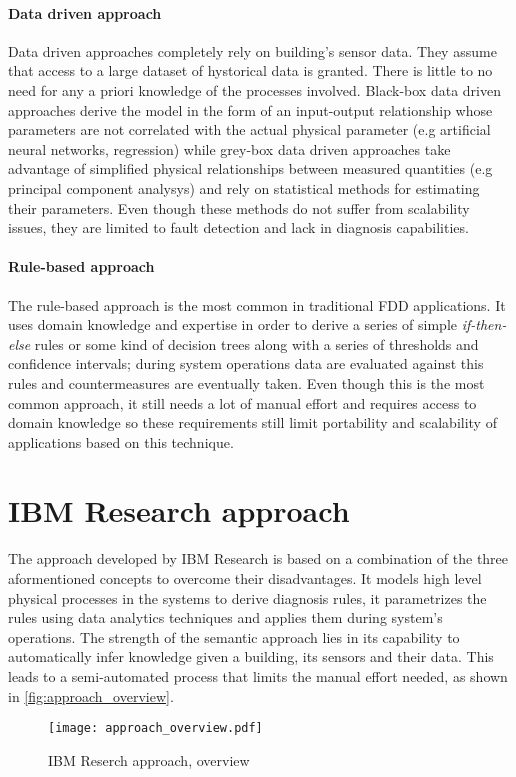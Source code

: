 \paragraph{Data driven approach} \label{subsec:data_models}
Data driven approaches completely rely on building's sensor data. They assume that access to a large dataset of hystorical data is granted. There is little to no need for any a priori knowledge of the processes involved. Black-box data driven approaches derive the model in the form of an input-output relationship whose parameters are not correlated with the actual physical parameter (e.g artificial neural networks, regression) while grey-box data driven approaches take advantage of simplified physical relationships between measured quantities (e.g principal component analysys) and rely on statistical methods for estimating their parameters. Even though these methods do not suffer from scalability issues, they are limited to fault detection and lack in diagnosis capabilities.

\paragraph{Rule-based approach} \label{subsec:rule_models}
The rule-based approach is the most common in traditional FDD applications. It uses domain knowledge and expertise in order to derive a series of simple \textit{if-then-else} rules or some kind of decision trees along with a series of thresholds and confidence intervals; during system operations data are evaluated against this rules and countermeasures are eventually taken. Even though this is the most common approach, it still needs a lot of manual effort and requires access to domain knowledge so these requirements still limit portability and scalability of applications based on this technique.

\section{IBM Research approach}
The approach developed by IBM Research is based on a combination of the three aformentioned concepts to overcome their disadvantages. It models high level physical processes in the systems to derive diagnosis rules, it parametrizes the rules using data analytics techniques and applies them during system's operations. The strength of the semantic approach lies in its capability to automatically infer knowledge given a building, its sensors and their data. This leads to a semi-automated process that limits the manual effort needed, as shown in \autoref{fig:approach_overview}.
\begin{figure}
  \centering
  \texttt{[image: approach\_overview.pdf]}
  \caption{IBM Reserch approach, overview}
  \label{fig:approach_overview}
\end{figure}

